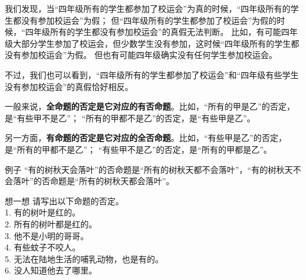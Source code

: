 \documentclass[12pt,UTF8,a4paper]{article}
\begin{document}
我们发现，当“四年级所有的学生都参加了校运会”为真的时候，“四年级所有的学生都没有参加校运会”为假；
但“四年级所有的学生都参加了校运会”为假的时候，“四年级所有的学生都没有参加校运会”的真假无法判断。
比如，有可能四年级大部分学生参加了校运会，但少数学生没有参加，这时候“四年级所有的学生都没有参加校运会”为假。
但也有可能四年级确实没有任何学生参加校运会。

不过，我们也可以看到，“四年级所有的学生都参加了校运会”和“四年级有些学生没有参加校运会”的真假恰好相反。

一般来说，\textbf{全命题的否定是它对应的有否命题}。比如，“所有的甲是乙”的否定，是“有些甲不是乙”；
“所有的甲都不是乙”的否定，是“有些甲是乙”。

另一方面，\textbf{有命题的否定是它对应的全否命题}。比如，“有些甲是乙”的否定，是“所有的甲都不是乙”；
“有些甲不是乙”的否定，是“所有的甲都是乙”。

\begin{blockin}{例子}
    “有的树秋天会落叶”的否命题是“所有的树秋天都不会落叶”，“有的树秋天不会落叶”的否命题是“所有的树秋天都会落叶”。
\end{blockin}

\begin{blockaft}{想一想}
    请写出以下命题的否定。\\
    1. 有的树叶是红的。\\
    2. 所有的树叶都是红的。 \\
    3. 他不是小明的哥哥。\\
    4. 有些蚊子不咬人。\\
    5. 无法在陆地生活的哺乳动物，也是有的。\\
    6. 没人知道他去了哪里。
\end{blockaft}
\end{document}

